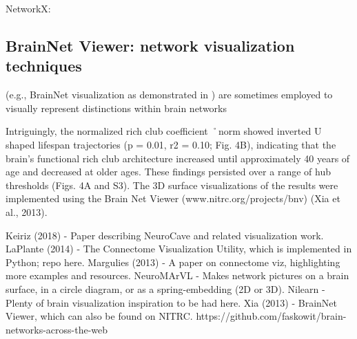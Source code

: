 NetworkX: 



\subsection{BrainNet Viewer: network visualization techniques}
(e.g., BrainNet visualization as 
demonstrated in \cite{Xia2013}) are sometimes employed to visually
represent distinctions within brain networks \cite{Tang2023}

Intriguingly, the normalized rich club coefficient ˚norm showed inverted
U shaped lifespan trajectories (p = 0.01, r2 = 0.10; Fig. 4B),
indicating that the brain’s functional rich club architecture increased 
until approximately 40 years of age and
decreased at older ages. These findings persisted over a
range of hub thresholds (Figs. 4A and S3). The 3D surface
visualizations of the results were implemented using the
Brain Net Viewer (www.nitrc.org/projects/bnv) (Xia et al.,
2013).
\cite{Cao2014}


Keiriz (2018) - Paper describing NeuroCave and related visualization work.
LaPlante (2014) - The Connectome Visualization Utility, which is implemented in Python; repo here.
Margulies (2013) - A paper on connectome viz, highlighting more examples and resources.
NeuroMArVL - Makes network pictures on a brain surface, in a circle diagram, or as a spring-embedding (2D or 3D).
Nilearn - Plenty of brain visualization inspiration to be had here.
Xia (2013) - BrainNet Viewer, which can also be found on NITRC.
https://github.com/faskowit/brain-networks-across-the-web


